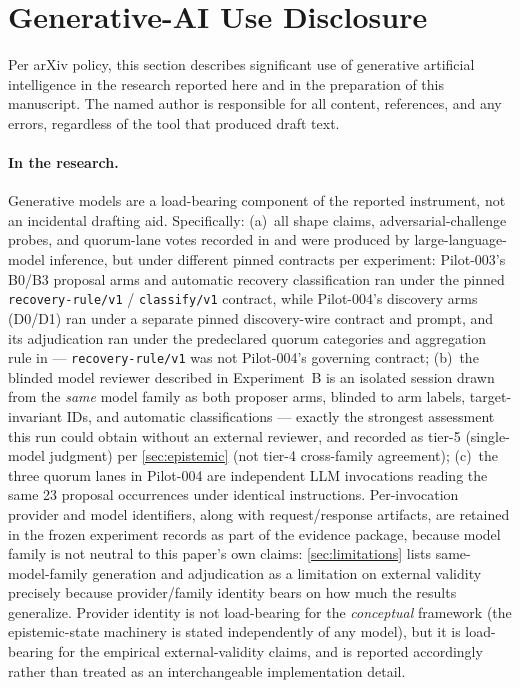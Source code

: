 \documentclass[11pt]{article}
\theoremstyle{gowthm}
\theoremstyle{gowplain}
\begin{document}
\section*{Generative-AI Use Disclosure}

Per arXiv policy, this section describes significant use of generative
artificial intelligence in the research reported here and in the preparation
of this manuscript. The named author is responsible for all content,
references, and any errors, regardless of the tool that produced draft text.

\paragraph{In the research.} Generative models are a load-bearing component
of the reported instrument, not an incidental drafting aid. Specifically:
(a)~all shape claims, adversarial-challenge probes, and quorum-lane votes
recorded in  and
 were produced by
large-language-model inference, but under different pinned contracts per
experiment: Pilot-003's B0/B3 proposal arms and automatic recovery
classification ran under the pinned \texttt{recovery-rule/v1} /
\texttt{classify/v1} contract, while Pilot-004's discovery arms (D0/D1) ran
under a separate pinned discovery-wire contract and prompt, and its
adjudication ran under the predeclared quorum categories and aggregation
rule in  --- \texttt{recovery-rule/v1}
was not Pilot-004's governing contract; (b)~the blinded model reviewer
described in Experiment~B is an isolated
session drawn from the \emph{same} model family as both proposer arms, blinded
to arm labels, target-invariant IDs, and automatic classifications --- exactly
the strongest assessment this run could obtain without an external reviewer,
and recorded as tier-5 (single-model judgment) per
\cref{sec:epistemic} (not tier-4 cross-family agreement); (c)~the three quorum
lanes in Pilot-004 are
independent LLM invocations reading the same 23 proposal occurrences under
identical instructions. Per-invocation provider and model identifiers, along
with request/response artifacts, are retained in the frozen experiment
records as part of the evidence package, because model family is not neutral
to this paper's own claims: \cref{sec:limitations} lists same-model-family
generation and adjudication as a limitation on external validity precisely
because provider/family identity bears on how much the results generalize.
Provider identity is not load-bearing for the \emph{conceptual} framework
(the epistemic-state machinery is stated independently of any model), but it
is load-bearing for the empirical external-validity claims, and is reported
accordingly rather than treated as an interchangeable implementation detail.
\end{document}
